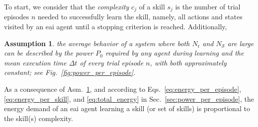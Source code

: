 \documentclass[12pt]{article}
\renewcommand{\emph}[1]{\textit{#1}}
\newtheorem{assumption}{Assumption}
\begin{document}
To start, we consider that the \emph{complexity} $c_j$ of a skill $ s_j $ is the number of trial episodes $n$ needed to successfully learn the skill, namely, all actions and states visited by an \ac{eai} agent until a stopping criterion is reached. Additionally,
\begin{tcolorbox}
	\begin{assumption}\label{assumption:power_and_episode_time}
		the average behavior of a system where both $N_\mathrm{r}$ and $N_\mathcal{S}$ are large can be described by the power $P_0$ required by any agent during learning and the mean execution time $\Delta t$ of every trial episode $n$, with both approximately constant; see Fig.~\ref{fig:power_per_episode}.
	\end{assumption}
\end{tcolorbox}
\noindent As a consequence of Asm.~\ref{assumption:power_and_episode_time}, and according to Eqs.~\eqref{eq:energy_per_episode},\eqref{eq:energy_per_skill}, and \eqref{eq:total_energy} in Sec.~\ref{sec:power_per_episode}, the energy demand of an \ac{eai} agent learning a skill (or set of skills) is proportional to the skill(s) complexity.
\end{document}
